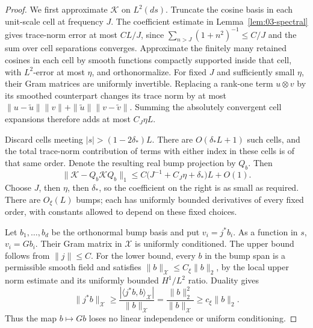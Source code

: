 \begin{proof}
We first approximate \(\mathscr K\) on \(L^2(ds)\). Truncate the cosine
basis in each unit-scale cell at frequency \(J\). The coefficient
estimate in Lemma~\ref{lem:03-spectral} gives trace-norm error at most
\(CL/J\), since \(\sum_{n>J}(1+n^2)^{-1}\le C/J\) and the sum over
cell separations converges. Approximate the finitely many retained
cosines in each cell by smooth functions compactly supported inside
that cell, with \(L^2\)-error at most \(\eta\), and orthonormalize.
For fixed \(J\) and sufficiently small \(\eta\), their Gram matrices
are uniformly invertible. Replacing a rank-one term \(u\otimes v\)
by its smoothed counterpart changes its trace norm by at most
\(\|u-\widetilde u\|\|v\|+
\|\widetilde u\|\|v-\widetilde v\|\).
Summing the absolutely convergent cell expansions therefore adds at
most \(C_J\eta L\).

Discard cells meeting \(|s|>(1-2\delta_*)L\). There are
\(O(\delta_*L+1)\) such cells, and the total trace-norm contribution
of terms with either index in these cells is of that same order.
Denote the resulting real bump projection by \(Q_b\). Then
\[
 \|\mathscr K-Q_b\mathscr KQ_b\|_1
 \le C\bigl(J^{-1}+C_J\eta+\delta_*\bigr)L+O(1).
\]
Choose \(J\), then \(\eta\), then \(\delta_*\), so the coefficient
on the right is as small as required. There are \(O_\xi(L)\) bumps;
each has uniformly bounded derivatives of every fixed order, with
constants allowed to depend on these fixed choices.

Let \(b_1,\ldots,b_d\) be the orthonormal bump basis and put
\(v_i=j^*b_i\). As a function in \(s\), \(v_i=Gb_i\).
Their Gram matrix in \(\mathcal X\) is uniformly conditioned. The
upper bound follows from \(\|j\|\le C\). For the lower bound, every
\(b\) in the bump span is a permissible smooth field and satisfies
\(\|b\|_{\mathcal X}\le C_\xi\|b\|_2\), by the local upper norm
estimate and its uniformly bounded \(H^1/L^2\) ratio. Duality gives
\[
 \|j^*b\|_{\mathcal X}
 \ge\frac{|\langle j^*b,b\rangle_{\mathcal X}|}
          {\|b\|_{\mathcal X}}
 =\frac{\|b\|_2^2}{\|b\|_{\mathcal X}}
 \ge c_\xi\|b\|_2.
\]
Thus the map \(b\mapsto Gb\) loses no linear independence or uniform
conditioning.


\end{proof}

